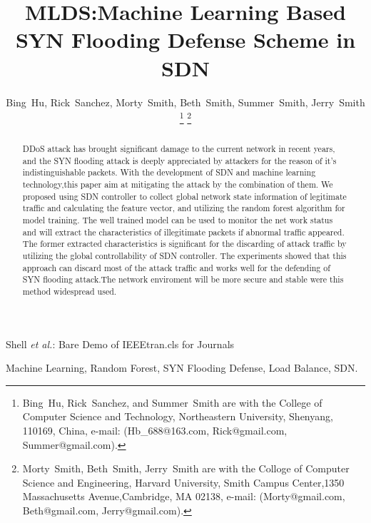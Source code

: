 \documentclass[journal]{IEEEtran}
\begin{document}
\title{MLDS:Machine Learning Based SYN Flooding Defense Scheme in SDN}

\author{Bing~Hu,
        Rick~Sanchez,
        Morty~Smith,
        Beth~Smith,
        Summer~Smith,
        Jerry~Smith

\thanks{Bing~Hu, Rick~Sanchez, and Summer~Smith are with the College of
Computer Science and Technology, Northeastern University,
Shenyang, 110169, China, e-mail: (Hb\_688@163.com,
Rick@gmail.com, Summer@gmail.com).}
\thanks{Morty~Smith, Beth~Smith, Jerry~Smith are with the Colloge of Computer Science and Engineering,
Harvard University, Smith Campus Center,1350 Massachusetts Avenue,Cambridge, MA 02138, e-mail:
(Morty@gmail.com, Beth@gmail.com, Jerry@gmail.com).}
}


{Shell \MakeLowercase{\textit{et al.}}: Bare Demo of IEEEtran.cls
for Journals}

\maketitle

\begin{abstract}
DDoS attack has brought significant damage to the current network in recent years, and the SYN flooding attack is deeply appreciated by attackers for the reason of it's indistinguishable packets. With the development of SDN and machine learning technology,this paper aim at  mitigating the attack by the combination of them. We proposed using SDN controller to collect global network state information of legitimate traffic and calculating the feature vector, and utilizing the random forest algorithm for model training. The well trained model can be used to monitor the net work status and will extract the characteristics of illegitimate packets if abnormal traffic appeared. The former extracted characteristics is significant for the discarding of attack traffic by utilizing the global controllability of SDN controller. The experiments showed that this approach can discard most of the attack traffic and works well for the defending of SYN flooding attack.The network enviroment will be more secure and stable were this method widespread used.
\end{abstract}


\begin{IEEEkeywords}
Machine Learning, Random Forest, SYN Flooding Defense, Load Balance, SDN.
\end{IEEEkeywords}
\end{document}
